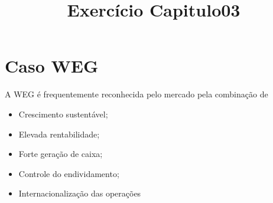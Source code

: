 
\title{Exercício Capitulo03}
\def\autor{Oscar Sérgio Monteiro}
\def\disciplina{SC334 - Avaliação de Desempenho Organizacional, turma b}
\def\professor{Antônio César Pitela}


\chapter{Caso WEG}
\begin{tcolorbox}[title=Caso WEG]                                      
 A WEG é frequentemente reconhecida pelo mercado pela combinação de
 \end{tcolorbox}                                                                
 
\begin{itemize}
\item Crescimento sustentável;
\item Elevada rentabilidade;
\item Forte geração de caixa;
\item Controle do endividamento;
\item Internacionalização das operações
\end{itemize}
